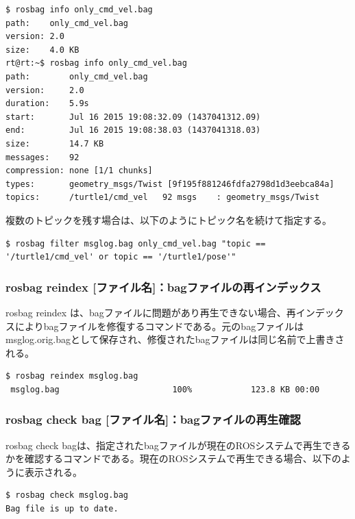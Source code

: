 \begin{lstlisting}[language=ROS]
$ rosbag info only_cmd_vel.bag
path:    only_cmd_vel.bag
version: 2.0
size:    4.0 KB
rt@rt:~$ rosbag info only_cmd_vel.bag
path:        only_cmd_vel.bag
version:     2.0
duration:    5.9s
start:       Jul 16 2015 19:08:32.09 (1437041312.09)
end:         Jul 16 2015 19:08:38.03 (1437041318.03)
size:        14.7 KB
messages:    92
compression: none [1/1 chunks]
types:       geometry_msgs/Twist [9f195f881246fdfa2798d1d3eebca84a]
topics:      /turtle1/cmd_vel   92 msgs    : geometry_msgs/Twist
\end{lstlisting}

複数のトピックを残す場合は、以下のようにトピック名を続けて指定する。

\begin{lstlisting}[language=ROS]
$ rosbag filter msglog.bag only_cmd_vel.bag "topic == '/turtle1/cmd_vel' or topic == '/turtle1/pose'"
\end{lstlisting}

\subsubsection{rosbag reindex [ファイル名]：bagファイルの再インデックス}

rosbag reindex は、bagファイルに問題があり再生できない場合、再インデックスによりbagファイルを修復するコマンドである。元のbagファイルはmsglog.orig.bagとして保存され、修復されたbagファイルは同じ名前で上書きされる。

\begin{lstlisting}[language=ROS]
$ rosbag reindex msglog.bag
 msglog.bag                       100%            123.8 KB 00:00
\end{lstlisting}

\subsubsection{rosbag check bag [ファイル名]：bagファイルの再生確認}

rosbag check bagは、指定されたbagファイルが現在のROSシステムで再生できるかを確認するコマンドである。現在のROSシステムで再生できる場合、以下のように表示される。

\begin{lstlisting}[language=ROS]
$ rosbag check msglog.bag
Bag file is up to date.
\end{lstlisting}

